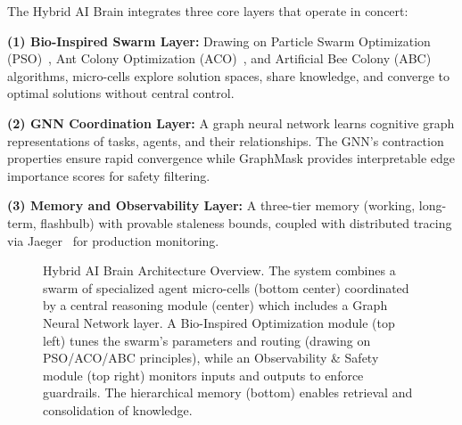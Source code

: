 \documentclass{article}
\begin{document}
    The Hybrid AI Brain integrates three core layers that operate in concert:
    
    \smallskip
    \textbf{(1) Bio-Inspired Swarm Layer:} Drawing on Particle Swarm Optimization (PSO)~\cite{kennedy1995particle}, Ant Colony Optimization (ACO)~\cite{dorigo1996ant}, and Artificial Bee Colony (ABC)~\cite{karaboga2005artificial} algorithms, micro-cells explore solution spaces, share knowledge, and converge to optimal solutions without central control.
    
    \smallskip
    \textbf{(2) GNN Coordination Layer:} A graph neural network learns cognitive graph representations of tasks, agents, and their relationships. The GNN's contraction properties ensure rapid convergence while GraphMask provides interpretable edge importance scores for safety filtering.
    
    \smallskip
    \textbf{(3) Memory and Observability Layer:} A three-tier memory (working, long-term, flashbulb) with provable staleness bounds, coupled with distributed tracing via Jaeger~\cite{jaeger2023tracing} for production monitoring.
    
    \begin{figure}[H]
        \centering
        \caption{Hybrid AI Brain Architecture Overview. The system combines a swarm of specialized agent micro-cells (bottom center) coordinated by a central reasoning module (center) which includes a Graph Neural Network layer. A Bio-Inspired Optimization module (top left) tunes the swarm's parameters and routing (drawing on PSO/ACO/ABC principles), while an Observability \& Safety module (top right) monitors inputs and outputs to enforce guardrails. The hierarchical memory (bottom) enables retrieval and consolidation of knowledge.}
        \label{fig:architecture}
        \end{figure}
    
\end{document}
